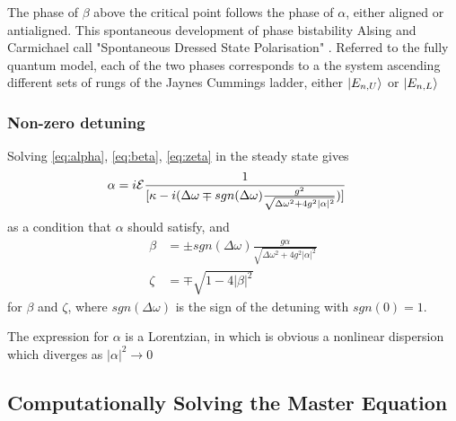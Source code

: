 The phase of $\beta$ above the critical point follows the phase of $\alpha$, either aligned or antialigned. This spontaneous development of phase bistability Alsing and Carmichael call "Spontaneous Dressed State Polarisation" \autocite{Alsing1999}. Referred to the fully quantum model, each of the two phases corresponds to a the system ascending different sets of rungs of the Jaynes Cummings ladder, either $| E_{n, U} \rangle$ or $| E_{n, L} \rangle$
\subsubsection{Non-zero detuning}
Solving \cref{eq:alpha}, \cref{eq:beta}, \cref{eq:zeta} in the steady state gives
\begin{align}
	\alpha& = i \mathcal{E}\frac{1}{[\kappa-i(\Delta \omega \mp sgn(\Delta \omega) \frac{g^2}{\sqrt{\Delta \omega^2 +4g^2 |\alpha|^2}})]}
\end{align}
as a condition that $\alpha$ should satisfy, and
\begin{align}
	\beta& = \pm sgn(\Delta \omega) \frac{g \alpha}{\sqrt{\Delta \omega^2 + 4 g^2 |\alpha|^2}}\\
	\zeta& = \mp \sqrt{1-4|\beta|^2}
\end{align}
for $\beta$ and $\zeta$, where $sgn(\Delta \omega)$ is the sign of the detuning with $sgn(0) = 1$.

The expression for $\alpha$ is a Lorentzian, in which is obvious a nonlinear dispersion which diverges as $|\alpha|^2 \rightarrow 0$

\subsection{Computationally Solving the Master Equation}

